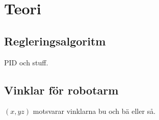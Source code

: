 
\section{Teori}

\subsection{Regleringsalgoritm}

PID och stuff.

\subsection{Vinklar för robotarm}

$(x, y z)$ motsvarar vinklarna bu och bä eller så.
